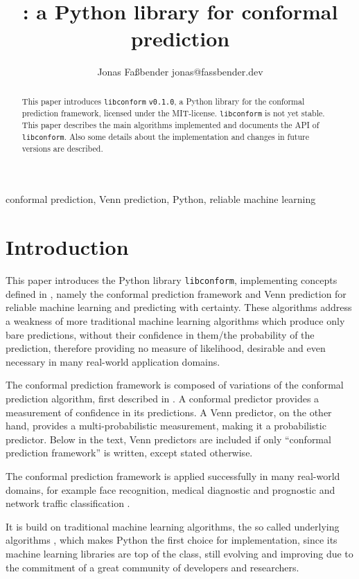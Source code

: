 \documentclass[twoside,11pt]{article}
\title{\libconform{} \version: a Python library for
       conformal prediction}
\author{\name Jonas Fa{\ss}bender
        \email jonas@fassbender.dev}
\def\version{\texttt{v0.1.0}}
\def\libconform{\texttt{libconform}}
\begin{document}
\maketitle

\begin{abstract}%
This paper introduces \libconform{} \version{}, a Python
library for the conformal prediction framework, licensed
under the MIT-license.
\libconform{} is not yet stable.
This paper describes the main algorithms implemented and
documents the API of \libconform{}.
Also some details about the implementation and changes in
future versions are described.
\end{abstract}

\begin{keywords}
conformal prediction, Venn prediction, Python,
reliable machine learning
\end{keywords}


\section{Introduction}

This paper introduces the Python library \libconform,
implementing concepts defined in \citet{alrw}, namely the
conformal prediction framework and Venn prediction for
reliable machine learning and predicting with certainty.
These algorithms address a weakness of more traditional
machine learning algorithms which produce only bare
predictions, without their confidence in them/the
probability of the prediction, therefore providing no
measure of likelihood, desirable and even necessary in many
real-world application domains.

The conformal prediction framework is composed of
variations of the conformal prediction algorithm,
first described in
\citet{vovk_et_al_1999, saunders_et_al_1999}.
A conformal predictor provides a measurement of confidence
in its predictions.
A Venn predictor, on the other hand, provides a
multi-probabilistic measurement, making it a probabilistic
predictor.
Below in the text, Venn predictors are included if only
``conformal prediction framework'' is written, except
stated otherwise.

The conformal prediction framework is applied successfully
in many real-world domains, for example face recognition,
medical diagnostic and prognostic and network traffic
classification \citep[see][Part 3]{cprml}.

It is build on traditional machine learning algorithms, the
so called underlying algorithms
\citep[see][]{papadopoulos_et_al_2007}, which makes Python
the first choice for implementation, since its machine
learning libraries are top of the class, still evolving and
improving due to the commitment of a great community of
developers and researchers.
\end{document}

